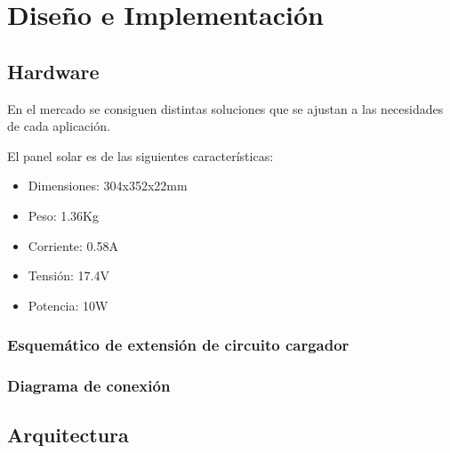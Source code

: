
\chapter{Diseño e Implementación} %

\label{Chapter3} %

\section{Hardware}
\label{sec:hard}
En el mercado se consiguen distintas soluciones que se ajustan a las necesidades de cada aplicación. 
 
\noindent El panel solar es de las siguientes características:
\begin{itemize}
\item Dimensiones: 304x352x22mm
\item Peso: 1.36Kg
\item Corriente: 0.58A
\item Tensión: 17.4V
\item Potencia: 10W
\end{itemize}

\subsection{Esquemático de extensión de circuito cargador}
\label{sec:extensión}

\subsection{Diagrama de conexión}
\label{sec:conexión}


\section{Arquitectura}
\label{sec:arq}

